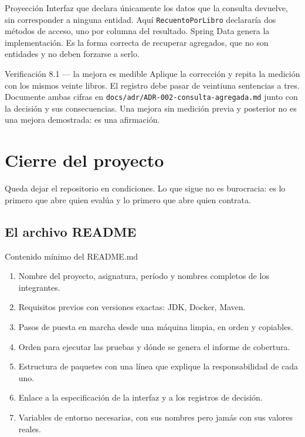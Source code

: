 \documentclass[11pt,a4paper,openany]{book}
\begin{document}
\begin{cajadefinicion}{Proyección}
	Interfaz que declara únicamente los datos que la consulta devuelve, sin corresponder a ninguna entidad. Aquí \texttt{RecuentoPorLibro} declararía dos métodos de acceso, uno por columna del resultado. Spring Data genera la implementación. Es la forma correcta de recuperar agregados, que no son entidades y no deben forzarse a serlo.
\end{cajadefinicion}

\begin{cajaejercicio}{Verificación 8.1 --- la mejora es medible}
	Aplique la corrección y repita la medición con los mismos veinte libros. El registro debe pasar de veintiuna sentencias a tres. Documente ambas cifras en \texttt{docs/adr/ADR-002-consulta-agregada.md} junto con la decisión y sus consecuencias. Una mejora sin medición previa y posterior no es una mejora demostrada: es una afirmación.
\end{cajaejercicio}

\section{Cierre del proyecto}
\label{sec:cierre}

Queda dejar el repositorio en condiciones. Lo que sigue no es burocracia: es lo primero que abre quien evalúa y lo primero que abre quien contrata.

\subsection{El archivo README}
\label{sec:readme}

\begin{cajabuenas}{Contenido mínimo del README.md}
	\begin{enumerate}
		\item Nombre del proyecto, asignatura, período y nombres completos de los integrantes.
		\item Requisitos previos con versiones exactas: JDK, Docker, Maven.
		\item Pasos de puesta en marcha desde una máquina limpia, en orden y copiables.
		\item Orden para ejecutar las pruebas y dónde se genera el informe de cobertura.
		\item Estructura de paquetes con una línea que explique la responsabilidad de cada uno.
		\item Enlace a la especificación de la interfaz y a los registros de decisión.
		\item Variables de entorno necesarias, con sus nombres pero jamás con sus valores reales.
	\end{enumerate}
\end{cajabuenas}
\end{document}
